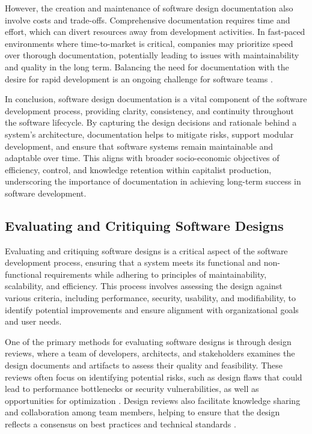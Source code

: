 \begin{refsection}
However, the creation and maintenance of software design documentation also involve costs and trade-offs. Comprehensive documentation requires time and effort, which can divert resources away from development activities. In fast-paced environments where time-to-market is critical, companies may prioritize speed over thorough documentation, potentially leading to issues with maintainability and quality in the long term. Balancing the need for documentation with the desire for rapid development is an ongoing challenge for software teams \cite[pp.~95-97]{Fowler2004}.

In conclusion, software design documentation is a vital component of the software development process, providing clarity, consistency, and continuity throughout the software lifecycle. By capturing the design decisions and rationale behind a system's architecture, documentation helps to mitigate risks, support modular development, and ensure that software systems remain maintainable and adaptable over time. This aligns with broader socio-economic objectives of efficiency, control, and knowledge retention within capitalist production, underscoring the importance of documentation in achieving long-term success in software development.

\subsection{Evaluating and Critiquing Software Designs}

Evaluating and critiquing software designs is a critical aspect of the software development process, ensuring that a system meets its functional and non-functional requirements while adhering to principles of maintainability, scalability, and efficiency. This process involves assessing the design against various criteria, including performance, security, usability, and modifiability, to identify potential improvements and ensure alignment with organizational goals and user needs.

One of the primary methods for evaluating software designs is through design reviews, where a team of developers, architects, and stakeholders examines the design documents and artifacts to assess their quality and feasibility. These reviews often focus on identifying potential risks, such as design flaws that could lead to performance bottlenecks or security vulnerabilities, as well as opportunities for optimization \cite[pp.~212-215]{Pfleeger2010}. Design reviews also facilitate knowledge sharing and collaboration among team members, helping to ensure that the design reflects a consensus on best practices and technical standards \cite[pp.~150-153]{Bass2021}.


\end{refsection}
